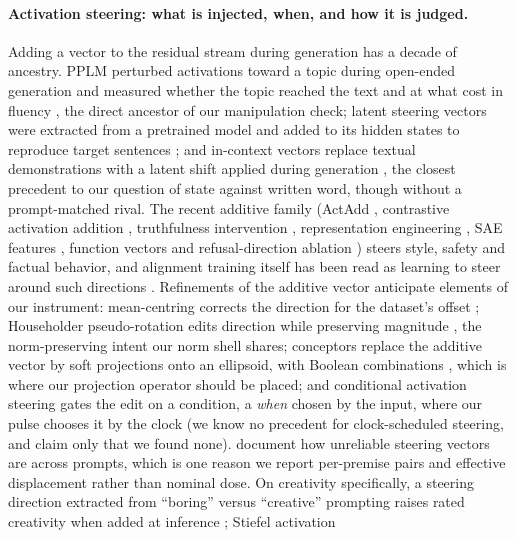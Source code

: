 \documentclass[11pt]{article}
\begin{document}
\paragraph{Activation steering: what is injected, when, and how it is
judged.} Adding a vector to the residual stream during generation has a
decade of ancestry. PPLM perturbed activations toward a topic during
open-ended generation and measured whether the topic reached the text
and at what cost in fluency \citep{dathathri2020pplm}, the direct
ancestor of our manipulation check; latent steering vectors were
extracted from a pretrained model and added to its hidden states to
reproduce target sentences \citep{subramani2022latent}; and in-context
vectors replace textual demonstrations with a latent shift applied
during generation \citep{liu2023icv}, the closest precedent to our
question of state against written word, though without a prompt-matched
rival. The recent additive family (ActAdd \citep{turner2023actadd},
contrastive activation addition \citep{panickssery2023caa}, truthfulness
intervention \citep{li2023iti}, representation engineering
\citep{zou2023repe}, SAE features \citep{cunningham2023sae,templeton2024scaling},
function vectors \citep{todd2023function} and refusal-direction ablation
\citep{arditi2024refusal}) steers style, safety and factual behavior,
and alignment training itself has been read as learning to steer around
such directions \citep{lee2024mechanistic}. Refinements of the additive
vector anticipate elements of our instrument: mean-centring corrects the
direction for the dataset's offset \citep{jorgensen2023mean};
Householder pseudo-rotation edits direction while preserving magnitude
\citep{pham2024householder}, the norm-preserving intent our norm shell
shares; conceptors replace the additive vector by soft projections onto
an ellipsoid, with Boolean combinations \citep{postmus2024conceptors},
which is where our projection operator should be placed; and conditional
activation steering \citep{lee2025programming} gates the edit on a
condition, a \emph{when} chosen by the input, where our pulse chooses
it by the clock (we know no precedent for clock-scheduled steering, and
claim only that we found none). \citet{tan2024analysing} document how
unreliable steering vectors are across prompts, which is one reason we
report per-premise pairs and effective displacement rather than nominal
dose. On creativity specifically, a steering direction extracted from
``boring'' versus ``creative'' prompting raises rated creativity when
added at inference \citep{olson2024creativity}; Stiefel activation
\end{document}
